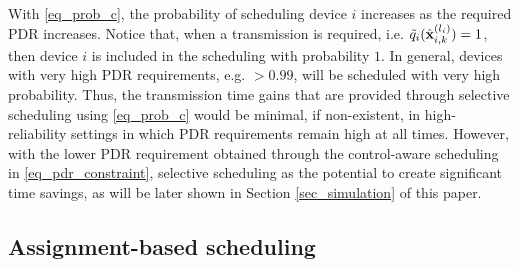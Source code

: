 With \eqref{eq_prob_c}, the probability of scheduling device $i$ increases as the required PDR increases. Notice that, when a transmission is required, i.e. ${\tilde q}_i({\hat{\mathbf x} }^{(l_i)}_{i,k}) = 1$, then device $i$ is included in the scheduling with probability $1$. In general, devices with very high PDR requirements, e.g. $>0.99$, will be scheduled with very high probability. Thus, the transmission time gains that are provided through selective scheduling using \eqref{eq_prob_c} would be minimal, if non-existent, in high-reliability settings in which PDR requirements remain high at all times. However, with the lower PDR requirement obtained through the control-aware scheduling in \eqref{eq_pdr_constraint}, selective scheduling as the potential to create significant time savings, as will be later shown in Section \ref{sec_simulation} of this paper.



\subsection{Assignment-based scheduling}\label{sec_assignment}


